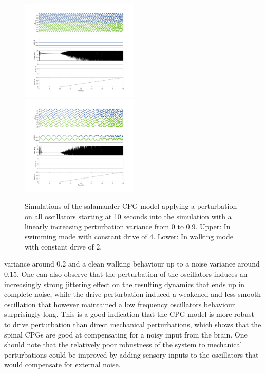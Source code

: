 \documentclass[a4paper]{scrartcl}
\begin{document}
{\begin{figure}[!h]
	\includegraphics[width=0.5\textwidth]{fig/figure7b_allphase-swim.png}
	\includegraphics[width=0.5\textwidth]{fig/figure7b_allphase-walk.png}
	\caption{Simulations of the salamander CPG model applying a perturbation on all oscillators starting at 10 seconds into the simulation with a linearly increasing perturbation variance from 0 to 0.9. Upper: In swimming mode with constant drive of 4. Lower: In walking mode with constant drive of 2.}
	\label{fig:7b-allphase}
\end{figure}

{\setlength{\parindent}{0 cm}
variance around 0.2 and a clean walking behaviour up to a noise variance around 0.15. One can also observe that the perturbation of the oscillators induces an increasingly strong jittering effect on the resulting dynamics that ends up in complete noise, while the drive perturbation induced a weakened and less smooth oscillation that however maintained a low frequency oscillators behaviour surprisingly long. This is a good indication that the CPG model is more robust to drive perturbation than direct mechanical perturbations, which shows that the spinal CPGs are good at compensating for a noisy input from the brain. One should note that the relatively poor robustness of the system to mechanical perturbations could be improved by adding sensory inputs to the oscillators that would compensate for external noise.
}

}
\end{document}
